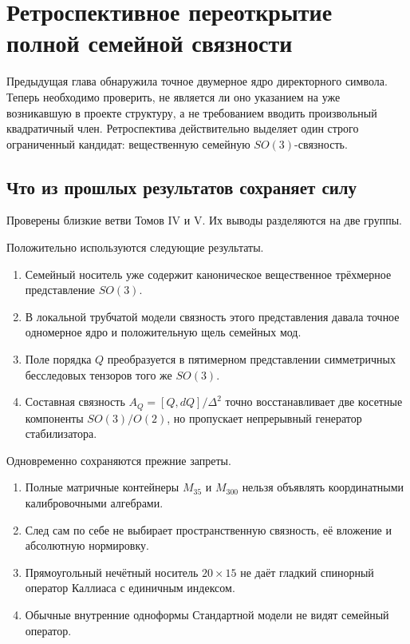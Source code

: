 \chapter{Ретроспективное переоткрытие полной семейной связности}

Предыдущая глава обнаружила точное двумерное ядро директорного символа.
Теперь необходимо проверить, не является ли оно указанием на уже
возникавшую в проекте структуру, а не требованием вводить произвольный
квадратичный член. Ретроспектива действительно выделяет один строго
ограниченный кандидат: вещественную семейную $SO(3)$-связность.

\section{Что из прошлых результатов сохраняет силу}

Проверены близкие ветви Томов IV и V. Их выводы разделяются на две группы.

Положительно используются следующие результаты.
\begin{enumerate}
 \item Семейный носитель уже содержит каноническое вещественное
 трёхмерное представление $SO(3)$.
 \item В локальной трубчатой модели связность этого представления давала
 точное одномерное ядро и положительную щель семейных мод.
 \item Поле порядка $Q$ преобразуется в пятимерном представлении
 симметричных бесследовых тензоров того же $SO(3)$.
 \item Составная связность $A_Q=[Q,dQ]/\Delta^2$ точно восстанавливает две
 косетные компоненты $SO(3)/O(2)$, но пропускает непрерывный генератор
 стабилизатора.
\end{enumerate}

Одновременно сохраняются прежние запреты.
\begin{enumerate}
 \item Полные матричные контейнеры $M_{35}$ и $M_{300}$ нельзя объявлять
 координатными калибровочными алгебрами.
 \item След сам по себе не выбирает пространственную связность, её
 вложение и абсолютную нормировку.
 \item Прямоугольный нечётный носитель $20\times15$ не даёт гладкий
 спинорный оператор Каллиаса с единичным индексом.
 \item Обычные внутренние одноформы Стандартной модели не видят семейный
 оператор.
\end{enumerate}

